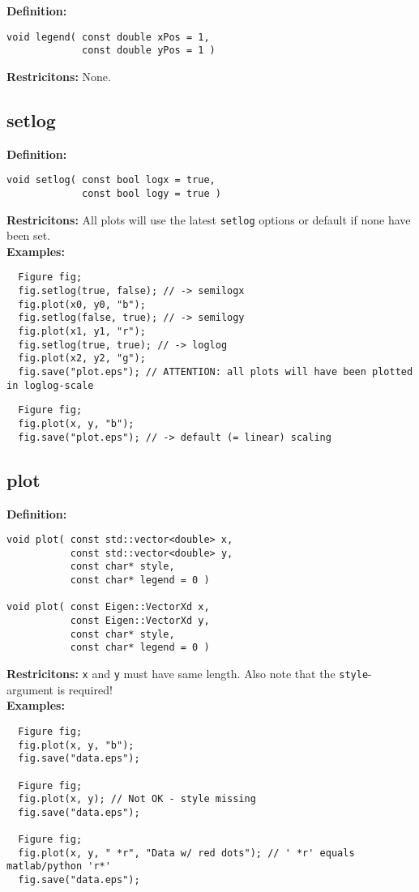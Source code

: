 \documentclass[a4paper]{article}
\newcommand{\command}[1]{\subsection{#1}}
\begin{document}
\textbf{Definition:}
\begin{lstlisting}
void legend( const double xPos = 1, 
             const double yPos = 1 )
\end{lstlisting}
%
\textbf{Restricitons:} None. 

\command{setlog}

\textbf{Definition:}
\begin{lstlisting}
void setlog( const bool logx = true, 
             const bool logy = true )
\end{lstlisting}
%
\textbf{Restricitons:} All plots will use the latest \texttt{setlog} options or default if none have been set. \\
%
\textbf{Examples:}
\begin{lstlisting}
  Figure fig;
  fig.setlog(true, false); // -> semilogx
  fig.plot(x0, y0, "b"); 
  fig.setlog(false, true); // -> semilogy
  fig.plot(x1, y1, "r");
  fig.setlog(true, true); // -> loglog
  fig.plot(x2, y2, "g");
  fig.save("plot.eps"); // ATTENTION: all plots will have been plotted in loglog-scale 
\end{lstlisting}
\begin{lstlisting}
  Figure fig;
  fig.plot(x, y, "b");
  fig.save("plot.eps"); // -> default (= linear) scaling
\end{lstlisting}


\command{plot} 

\textbf{Definition:} 
\begin{lstlisting}
void plot( const std::vector<double> x, 
           const std::vector<double> y, 
           const char* style, 
           const char* legend = 0 ) 

void plot( const Eigen::VectorXd x, 
           const Eigen::VectorXd y, 
           const char* style, 
           const char* legend = 0 )
\end{lstlisting}
\textbf{Restricitons:} \texttt{x} and \texttt{y} must have same length. Also note that the \texttt{style}-argument is required! \\
%
\textbf{Examples:}
\begin{lstlisting}
  Figure fig;
  fig.plot(x, y, "b");
  fig.save("data.eps");

  Figure fig;
  fig.plot(x, y); // Not OK - style missing
  fig.save("data.eps");

  Figure fig;
  fig.plot(x, y, " *r", "Data w/ red dots"); // ' *r' equals matlab/python 'r*'
  fig.save("data.eps");
\end{lstlisting}
\end{document}
